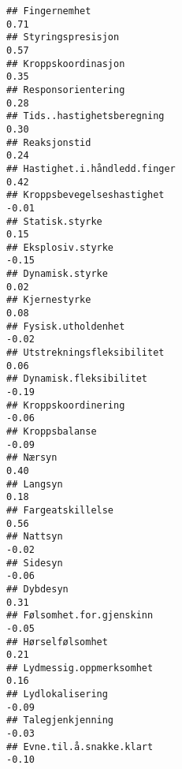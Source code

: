 \documentclass[
]{article}
\begin{document}
\begin{verbatim}
## Fingernemhet                                                                      0.71
## Styringspresisjon                                                                 0.57
## Kroppskoordinasjon                                                                0.35
## Responsorientering                                                                0.28
## Tids..hastighetsberegning                                                         0.30
## Reaksjonstid                                                                      0.24
## Hastighet.i.håndledd.finger                                                       0.42
## Kroppsbevegelseshastighet                                                        -0.01
## Statisk.styrke                                                                    0.15
## Eksplosiv.styrke                                                                 -0.15
## Dynamisk.styrke                                                                   0.02
## Kjernestyrke                                                                      0.08
## Fysisk.utholdenhet                                                               -0.02
## Utstrekningsfleksibilitet                                                         0.06
## Dynamisk.fleksibilitet                                                           -0.19
## Kroppskoordinering                                                               -0.06
## Kroppsbalanse                                                                    -0.09
## Nærsyn                                                                            0.40
## Langsyn                                                                           0.18
## Fargeatskillelse                                                                  0.56
## Nattsyn                                                                          -0.02
## Sidesyn                                                                          -0.06
## Dybdesyn                                                                          0.31
## Følsomhet.for.gjenskinn                                                          -0.05
## Hørselfølsomhet                                                                   0.21
## Lydmessig.oppmerksomhet                                                           0.16
## Lydlokalisering                                                                  -0.09
## Talegjenkjenning                                                                 -0.03
## Evne.til.å.snakke.klart                                                          -0.10

\end{verbatim}
\end{document}
